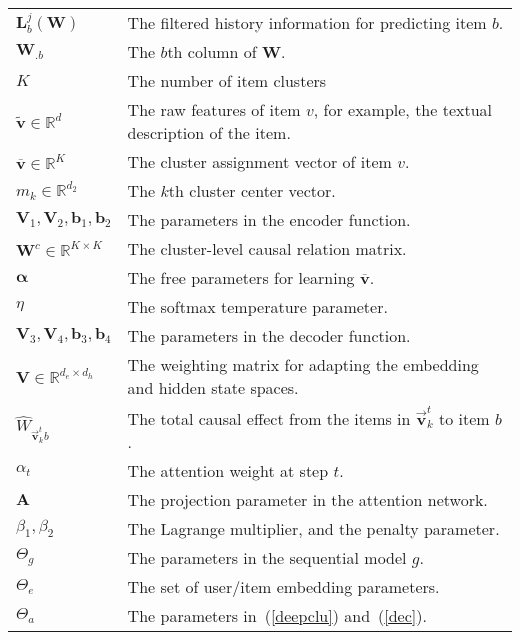 \documentclass[conference]{IEEEtran}
\theoremstyle{definition}
\theoremstyle{theorem}
\theoremstyle{proof}
\theoremstyle{remark}
\begin{document}
\begin{table}[t]
{\begin{threeparttable}
\begin{tabular}{p{}<{\centering}|p{4.8cm}<{\centering}}
	            $\bm{L}_b^j(\bm{W})$&The filtered history information for predicting item $b$. \\ 
	            $\bm{W}_{.b}$&The $b$th column of $\bm{W}$.\\ 
				$K$  & The number of item clusters \\ 
				$\tilde{\bm{v}}\in \mathbb{R}^{d}$  & The raw features of item $v$, for example, the textual description of the item. \\ 
				$\overline{\bm{v}}\in \mathbb{R}^{K}$  & The cluster assignment vector of item $v$.\\ 
				$m_k \in \mathbb{R}^{d_2}$  & The $k$th cluster center vector.\\ 
                $\bm{V}_1, \bm{V}_2, \bm{b}_1, \bm{b}_2$& The parameters in the encoder function.\\ 
				$\bm{W}^c\in \mathbb{R}^{K\times K}$  &The cluster-level causal relation matrix.\\ 
                $\bm{\alpha}$&The free parameters for learning $\overline{\bm{v}}$.\\ 
                $\eta$&The {softmax} temperature parameter.\\ 
                $\bm{V}_3, \bm{V}_4, \bm{b}_3, \bm{b}_4$& The parameters in the decoder function.\\ 
                $\bm{V}\in \mathbb{R}^{d_e\times d_h}$&The weighting matrix for adapting the embedding and hidden state spaces.\\ 
                $\hat{{W}}_{\vec{\bm{v}}_k^{t}b}$ &The total causal effect from the items in $\vec{\bm{v}}_k^{t}$ to item $b$.\\ 
                $\alpha_t$&The attention weight at step $t$.\\ 
                $\bm{A}$&The projection parameter in the attention network.\\ 
                $\beta_1, \beta_2$ &The Lagrange multiplier, and the penalty parameter.\\ 
                $\Theta_{g}$ &The parameters in the sequential model $g$.\\ 
                $\Theta_{e}$ &The set of user/item embedding parameters.\\ 
                $\Theta_{a}$ &The parameters in~(\ref{deepclu}) and~(\ref{dec}).\\ \hline
				\hline
			\end{tabular}
	\end{threeparttable} }
	\label{rec-notation}
	\vspace{-0.cm}
\end{table}
\end{document}
